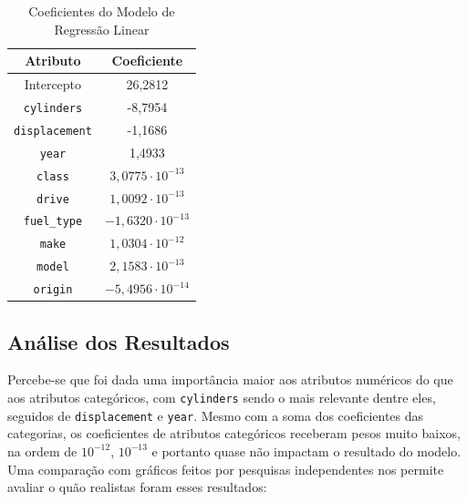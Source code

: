 \documentclass{report}
\begin{document}
\begin{table}[h!]
  \centering
  \begin{tabular}{| c | c |}
      \hline
      \rowcolor{lightgray}
      \textbf{Atributo} & \textbf{Coeficiente} \\
      \hline
      Intercepto & 26,2812 \\
      \hline
      \texttt{cylinders} & -8,7954 \\
      \hline
      \texttt{displacement} & -1,1686 \\
      \hline
      \texttt{year} & 1,4933 \\
      \hline
      \texttt{class} & \(3,\!0775 \cdot 10^{-13}\) \\
      \hline
      \texttt{drive} & \(1,\!0092 \cdot 10^{-13}\) \\
      \hline
      \texttt{fuel\_type} & \(-1,\!6320 \cdot 10^{-13}\) \\
      \hline
      \texttt{make} & \(1,\!0304 \cdot 10^{-12}\) \\
      \hline
      \texttt{model} & \(2,\!1583 \cdot 10^{-13}\) \\
      \hline
      \texttt{origin} & \(-5,\!4956 \cdot 10^{-14}\) \\
      \hline
  \end{tabular}
  \caption{\label{table:linear_regression_coef} Coeficientes do Modelo de Regressão Linear}
\end{table}

\clearpage
\subsection{Análise dos Resultados} \label{subsec: analiseresultados}
Percebe-se que foi dada uma importância maior aos atributos numéricos do que aos atributos categóricos,
com \texttt{cylinders} sendo o mais relevante dentre eles, seguidos de \texttt{displacement} e \texttt{year}.
Mesmo com a soma dos coeficientes das categorias, os coeficientes de atributos categóricos receberam pesos muito
baixos, na ordem de \(10^{-12}\), \(10^{-13}\) e portanto quase não impactam o resultado do modelo. Uma comparação
com gráficos feitos por pesquisas independentes nos permite avaliar o quão realistas foram esses resultados:
\end{document}
